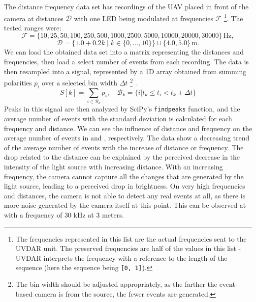 The distance frequency data set has recordings of the \ac{UAV} placed in front of the camera at distances $\mathcal{D}$ with one \ac{LED} being modulated
at frequencies $\mathcal{F}$ \footnote{The frequencies represented in this list are the actual frequencies sent to the UVDAR unit. The preserved frequencies
are half of the values in this list - UVDAR interprets the frequency with a reference to the length of the sequence (here the sequence being \texttt{[0, 1]}).}.
The tested ranges were:
\[
\mathcal{F} = \{10, 25, 50, 100, 250, 500, 1000, 2500, 5000, 10000, 20000, 30000\} \, \text{Hz},
\]
\[
\mathcal{D} = \{1.0 + 0.2k \mid k \in \{0, \dots, 10\}\} \cup \{4.0, 5.0\} \, \text{m}.
\]
We can load the obtained data set into a matrix representing the distances and frequencies, then load a select number of events from each recording.
The data is then resampled into a signal, represented by a 1D array obtained from summing polarities $p_i$ over a selected bin width $\Delta t$
\footnote{The bin width should be adjusted appropriately, as the farther the event-based camera is from the source, the fewer events are generated.} .
\begin{equation}
    S[k] = \sum_{i\in\mathcal{B}_k}p_i, \quad \mathcal{B}_k=\{i|t_k\leq t_i<t_k+\Delta t\}
    \label{eq:signal}
\end{equation}
Peaks in this signal are then analyzed by SciPy's \texttt{findpeaks} function,
and the average number of events with the standard deviation is calculated for each frequency and distance.
We can see the influence of distance and frequency on the average number of events in  and , respectively. The data show a decreasing trend of the average number of events
with the increase of distance or frequency. The drop related to the distance can be explained by the perceived decrease in the intensity of the light source with increasing distance. With an increasing frequency, the camera cannot capture
all the changes that are generated by the light source, leading to a perceived drop in brightness.
On very high frequencies and distances, the camera is not able
to detect any real events at all, as there is more noise generated by the camera itself at this point. This can be observed
at  with a frequency of $30$ kHz at $3$ meters.

